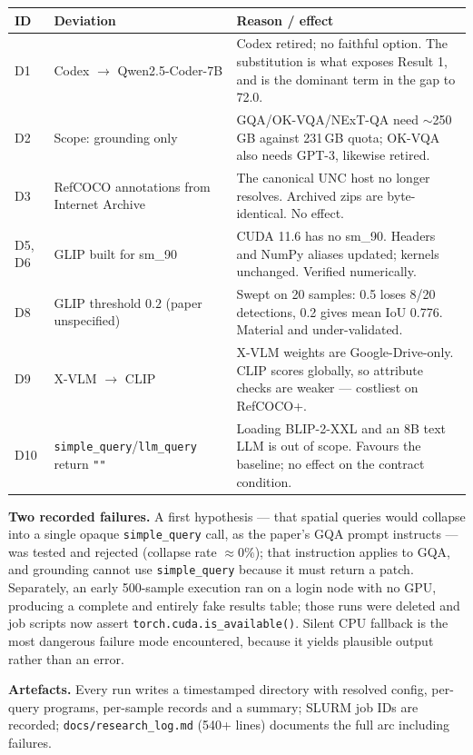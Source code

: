 \documentclass[11pt,a4paper]{article}
\begin{document}
\begin{center}\small
\begin{tabular}{@{}p{}p{}p{}@{}}
\toprule
\textbf{ID} & \textbf{Deviation} & \textbf{Reason / effect} \\
\midrule
D1 & Codex $\rightarrow$ Qwen2.5-Coder-7B & Codex retired; no faithful option. The
substitution is what exposes Result 1, and is the dominant term in the gap to 72.0. \\
D2 & Scope: grounding only & GQA/OK-VQA/NExT-QA need $\sim$250\,GB against 231\,GB
quota; OK-VQA also needs GPT-3, likewise retired. \\
D3 & RefCOCO annotations from Internet Archive & The canonical UNC host no longer
resolves. Archived zips are byte-identical. No effect. \\
D5, D6 & GLIP built for sm\_90 & CUDA 11.6 has no sm\_90. Headers and NumPy aliases
updated; kernels unchanged. Verified numerically. \\
D8 & GLIP threshold $0.2$ (paper unspecified) & Swept on 20 samples: 0.5 loses 8/20
detections, 0.2 gives mean IoU 0.776. Material and under-validated. \\
D9 & X-VLM $\rightarrow$ CLIP & X-VLM weights are Google-Drive-only. CLIP scores
globally, so attribute checks are weaker --- costliest on RefCOCO+. \\
D10 & \texttt{simple\_query}/\texttt{llm\_query} return \texttt{""} & Loading
BLIP-2-XXL and an 8B text LLM is out of scope. Favours the baseline; no effect on the
contract condition. \\
\bottomrule
\end{tabular}
\end{center}

\vspace{4pt}
\textbf{Two recorded failures.} A first hypothesis --- that spatial queries would
collapse into a single opaque \texttt{simple\_query} call, as the paper's GQA prompt
instructs --- was tested and rejected (collapse rate $\approx0\%$); that instruction
applies to GQA, and grounding cannot use \texttt{simple\_query} because it must
return a patch. Separately, an early 500-sample execution ran on a login node with no
GPU, producing a complete and entirely fake results table; those runs were deleted
and job scripts now assert \texttt{torch.cuda.is\_available()}. Silent CPU fallback
is the most dangerous failure mode encountered, because it yields plausible output
rather than an error.

\textbf{Artefacts.} Every run writes a timestamped directory with resolved config,
per-query programs, per-sample records and a summary; SLURM job IDs are recorded;
\texttt{docs/research\_log.md} (540+ lines) documents the full arc including failures.
\end{document}
